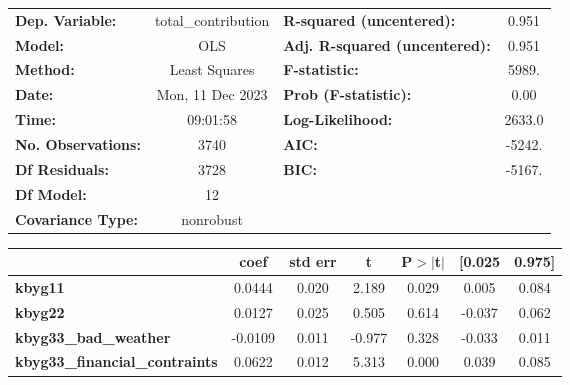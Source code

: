 \begin{center}
\begin{tabular}{lclc}
\toprule
\textbf{Dep. Variable:}                      & total\_contribution & \textbf{  R-squared (uncentered):}      &     0.951   \\
\textbf{Model:}                              &         OLS         & \textbf{  Adj. R-squared (uncentered):} &     0.951   \\
\textbf{Method:}                             &    Least Squares    & \textbf{  F-statistic:       }          &     5989.   \\
\textbf{Date:}                               &   Mon, 11 Dec 2023  & \textbf{  Prob (F-statistic):}          &     0.00    \\
\textbf{Time:}                               &       09:01:58      & \textbf{  Log-Likelihood:    }          &    2633.0   \\
\textbf{No. Observations:}                   &          3740       & \textbf{  AIC:               }          &    -5242.   \\
\textbf{Df Residuals:}                       &          3728       & \textbf{  BIC:               }          &    -5167.   \\
\textbf{Df Model:}                           &            12       & \textbf{                     }          &             \\
\textbf{Covariance Type:}                    &      nonrobust      & \textbf{                     }          &             \\
\bottomrule
\end{tabular}
\begin{tabular}{lcccccc}
                                             & \textbf{coef} & \textbf{std err} & \textbf{t} & \textbf{P$> |$t$|$} & \textbf{[0.025} & \textbf{0.975]}  \\
\midrule
\textbf{kbyg11}                              &       0.0444  &        0.020     &     2.189  &         0.029        &        0.005    &        0.084     \\
\textbf{kbyg22}                              &       0.0127  &        0.025     &     0.505  &         0.614        &       -0.037    &        0.062     \\
\textbf{kbyg33\_bad\_weather}                &      -0.0109  &        0.011     &    -0.977  &         0.328        &       -0.033    &        0.011     \\
\textbf{kbyg33\_financial\_contraints}       &       0.0622  &        0.012     &     5.313  &         0.000        &        0.039    &        0.085     \\

\end{tabular}
\end{center}
